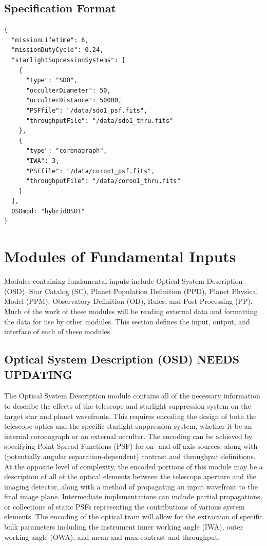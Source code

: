\documentclass[]{asme2ej}
\begin{document}
\subsection{Specification Format}
\begin{verbatim}
{
  "missionLifetime": 6,
  "missionDutyCycle": 0.24,
  "starlightSupressionSystems": [
    {
      "type": "SDO",
      "occulterDiameter": 50,
      "occulterDistance": 50000,
      "PSFfile": "/data/sdo1_psf.fits",
      "throughputFile": "/data/sdo1_thru.fits"
    },
    {
      "type": "coronagraph",
      "IWA": 3,
      "PSFfile": "/data/coron1_psf.fits",
      "throughputFile": "/data/coron1_thru.fits"
    }
  ],
  OSDmod: "hybridOSD1"
}
\end{verbatim}


\section{Modules of Fundamental Inputs}\label{sec:modules}
Modules containing fundamental inputs include Optical System Description (OSD), Star Catalog (SC), Planet Population Definition (PPD), Planet Physical Model (PPM), Observatory Definition (OD), Rules, and Post-Processing (PP). Much of the work of these modules will be reading external data and formatting the data for use by other modules. This section defines the input, output, and interface of each of these modules.


\subsection{Optical System Description (OSD) NEEDS UPDATING}
The Optical System Description module contains all of the necessary information to describe the effects of the telescope and starlight suppression system on the target star and planet wavefronts.  This requires encoding the design of both the telescope optics and the specific starlight suppression system, whether it be an internal coronagraph or an external occulter.  The encoding can be achieved by specifying Point Spread Functions (PSF) for on- and off-axis sources, along with (potentially angular separation-dependent) contrast and throughput definitions.  At the opposite level of complexity, the encoded portions of this module may be a description of all of the optical elements between the telescope aperture and the imaging detector, along with a method of propagating an input wavefront to the final image plane.  Intermediate implementations can include partial propagations, or collections of static PSFs representing the contributions of various system elements.  The encoding of the optical train will allow for the extraction of specific bulk parameters including the instrument inner working angle (IWA), outer working angle (OWA), and mean and max contrast and throughput.
\end{document}
